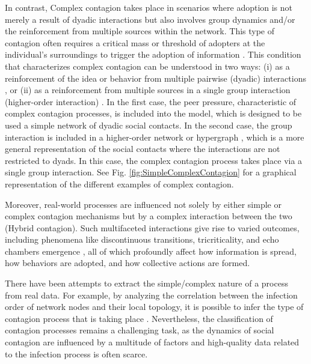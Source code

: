 In contrast, Complex contagion takes place in scenarios where adoption is not merely a result of dyadic interactions but also involves group dynamics and/or the reinforcement from multiple sources within the network. This type of contagion often requires a critical mass or threshold of adopters at the individual's surroundings to trigger the adoption of information \cite{centola-2007,centola-2010}. This condition that characterizes complex contagion can be understood in two ways: (i) as a reinforcement of the idea or behavior from multiple pairwise (dyadic) interactions \cite{centola-2007,centola-2010}, or (ii) as a reinforcement from multiple sources in a single group interaction (higher-order interaction) \cite{iacopini-2019,de-arruda-2020,battiston-2021}. In the first case, the peer pressure, characteristic of complex contagion processes, is included into the model, which is designed to be used a simple network of dyadic social contacts. In the second case, the group interaction is included in a higher-order network or hypergraph \cite{berge1984hypergraphs}, which is a more general representation of the social contacts where the interactions are not restricted to dyads. In this case, the complex contagion process takes place via a single group interaction. See Fig. \ref{fig:SimpleComplexContagion} for a graphical representation of the different examples of complex contagion.


Moreover, real-world processes are influenced not solely by either simple or complex contagion mechanisms but by a complex interaction between the two (Hybrid contagion). Such multifaceted interactions give rise to varied outcomes, including phenomena like discontinuous transitions, tricriticality, and echo chambers emergence \cite{min-2018,min-2018-dual,diaz-diaz-2022}, all of which profoundly affect how information is spread, how behaviors are adopted, and how collective actions are formed.

There have been attempts to extract the simple/complex nature of a process from real data. For example, by analyzing the correlation between the infection order of network nodes and their local topology, it is possible to infer the type of contagion process that is taking place \cite{cencetti-2023}. Nevertheless, the classification of contagion processes remains a challenging task, as the dynamics of social contagion are influenced by a multitude of factors and high-quality data related to the infection process is often scarce.

